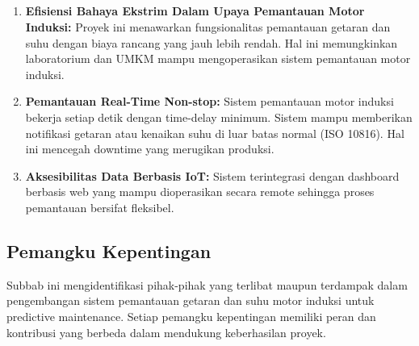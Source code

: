 \documentclass{elsinta}
\begin{document}
\subsection{\ValuePropTitle}


\begin{enumerate}
    \item \textbf{Efisiensi Bahaya Ekstrim Dalam Upaya Pemantauan Motor Induksi:} Proyek ini menawarkan fungsionalitas pemantauan getaran dan suhu dengan biaya rancang yang jauh lebih rendah. Hal ini memungkinkan laboratorium dan UMKM mampu mengoperasikan sistem pemantauan motor induksi.
    \item \textbf{Pemantauan Real-Time Non-stop:} Sistem pemantauan motor induksi bekerja setiap detik dengan time-delay minimum. Sistem mampu memberikan notifikasi getaran atau kenaikan suhu di luar batas normal (ISO 10816). Hal ini mencegah downtime yang merugikan produksi.
    \item \textbf{Aksesibilitas Data Berbasis IoT:} Sistem terintegrasi dengan dashboard berbasis web yang mampu dioperasikan secara remote sehingga proses pemantauan bersifat fleksibel.
\end{enumerate}


\subsection{Pemangku Kepentingan}

Subbab ini mengidentifikasi pihak-pihak yang terlibat maupun terdampak dalam pengembangan sistem pemantauan getaran dan suhu motor induksi untuk predictive maintenance. Setiap pemangku kepentingan memiliki peran dan kontribusi yang berbeda dalam mendukung keberhasilan proyek.
\end{document}
